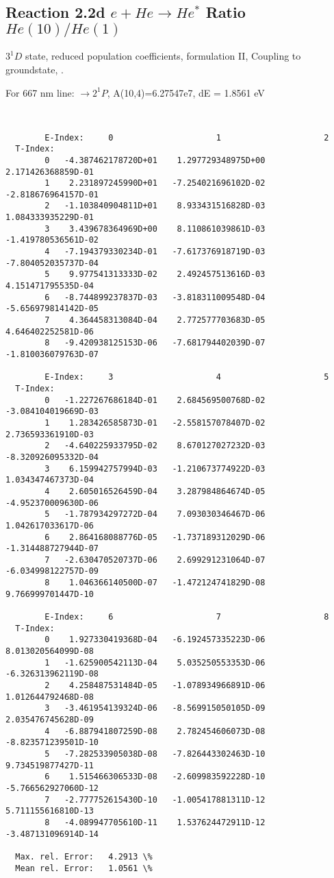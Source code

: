 \documentclass[12pt,dvipdfmx]{article}
\begin{document}
\subsection{
  Reaction 2.2d $e + He \rightarrow He^*  $ Ratio $He(10)/He(1)$
}

  $3^1D$ state,
  reduced population coefficients, formulation II,
  Coupling to groundstate, \cite{kn:Fujimoto}.

  For 667 nm line: $\rightarrow 2^1P$, A(10,4)=6.27547e7, dE = 1.8561 eV

\begin{small}\begin{verbatim}


        E-Index:     0                     1                     2
  T-Index:
        0   -4.387462178720D+01    1.297729348975D+00    2.171426368859D-01
        1    2.231897245990D+01   -7.254021696102D-02   -2.818676964157D-01
        2   -1.103840904811D+01    8.933431516828D-03    1.084333935229D-01
        3    3.439678364969D+00    8.110861039861D-03   -1.419780536561D-02
        4   -7.194379330234D-01   -7.617376918719D-03   -7.804052035737D-04
        5    9.977541313333D-02    2.492457513616D-03    4.151471795535D-04
        6   -8.744899237837D-03   -3.818311009548D-04   -5.656979814142D-05
        7    4.364458313084D-04    2.772577703683D-05    4.646402252581D-06
        8   -9.420938125153D-06   -7.681794402039D-07   -1.810036079763D-07

        E-Index:     3                     4                     5
  T-Index:
        0   -1.227267686184D-01    2.684569500768D-02   -3.084104019669D-03
        1    1.283426585873D-01   -2.558157078407D-02    2.736593361910D-03
        2   -4.640225933795D-02    8.670127027232D-03   -8.320926095332D-04
        3    6.159942757994D-03   -1.210673774922D-03    1.034347467373D-04
        4    2.605016526459D-04    3.287984864674D-05   -4.952370009630D-06
        5   -1.787934297272D-04    7.093030346467D-06    1.042617033617D-06
        6    2.864168088776D-05   -1.737189312029D-06   -1.314488727944D-07
        7   -2.630470520737D-06    2.699291231064D-07   -6.034998122757D-09
        8    1.046366140500D-07   -1.472124741829D-08    9.766999701447D-10

        E-Index:     6                     7                     8
  T-Index:
        0    1.927330419368D-04   -6.192457335223D-06    8.013020564099D-08
        1   -1.625900542113D-04    5.035250553353D-06   -6.326313962119D-08
        2    4.258487531484D-05   -1.078934966891D-06    1.012644792468D-08
        3   -3.461954139324D-06   -8.569915050105D-09    2.035476745628D-09
        4   -6.887941807259D-08    2.782454606073D-08   -8.823571239501D-10
        5   -7.282533905038D-08   -7.826443302463D-10    9.734519877427D-11
        6    1.515466306533D-08   -2.609983592228D-10   -5.766562927060D-12
        7   -2.777752615430D-10   -1.005417881311D-12    5.711155616810D-13
        8   -4.089947705610D-11    1.537624472911D-12   -3.487131096914D-14

  Max. rel. Error:   4.2913 \%
  Mean rel. Error:   1.0561 \%


\end{verbatim}\end{small}
\end{document}
